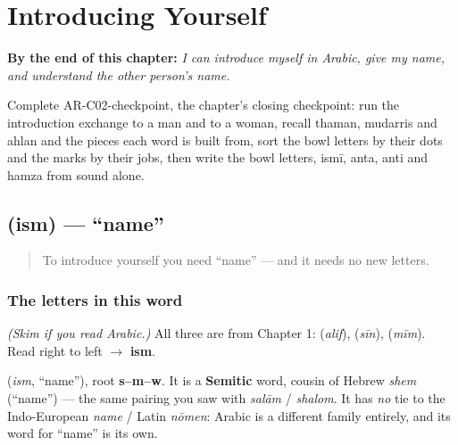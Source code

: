 
\chapter{Introducing Yourself}
\label{ch:introductions}

\begin{chapteropening}
\textbf{By the end of this chapter:} \emph{I can introduce myself in Arabic, give my name, and understand the other person's name.}

Complete AR-C02-checkpoint, the chapter's closing checkpoint: run the introduction exchange to a man and to a woman, recall thaman, mudarris and ahlan and the pieces each word is built from, sort the bowl letters by their dots and the marks by their jobs, then write the bowl letters, ismī, anta, anti and hamza from sound alone.
\end{chapteropening}

\section[\texorpdfstring{\ar{اسم} (ism)}{اسم (ism)}]{ (ism) — \textquotedblleft{}name\textquotedblright{}}

\label{lesson:AR-C02-ism}



\begin{quote}
To introduce yourself you need \textquotedblleft{}name\textquotedblright{} — and it needs no new letters.
\end{quote}

\subsection*{The letters in this word}
\emph{(Skim if you read Arabic.)} All three are from Chapter 1: \textbf{} (\emph{alif}), \textbf{} (\emph{sīn}), \textbf{} (\emph{mīm}). Read \textbf{} right to left $\to$ \textbf{ism}.

\begin{cousinweb}
\textbf{} (\emph{ism}, \textquotedblleft{}name\textquotedblright{}), root \textbf{s–m–w}. It is a \textbf{Semitic} word, cousin of Hebrew \emph{shem} (\textquotedblleft{}name\textquotedblright{}) — the same pairing you saw with \emph{salām} / \emph{shalom}. It has \emph{no} tie to the Indo-European \emph{name} / Latin \emph{nōmen}: Arabic is a different family entirely, and its word for \textquotedblleft{}name\textquotedblright{} is its own.
\end{cousinweb}

